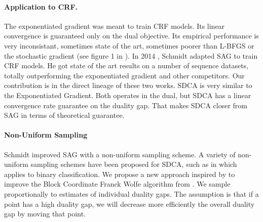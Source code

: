 \documentclass{article}
\DeclareMathOperator{\1}{\mathbb{1}}
\begin{document}
\paragraph{Application to CRF.}
The exponentiated gradient was meant to train CRF models.
Its linear convergence is guaranteed only on the dual objective.
Its empirical performance is very inconsistant, sometimes state of the art, sometimes poorer than L-BFGS or the stochastic gradient (see figure 1 in \cite{schmidt_non-uniform_2015}). 
In 2014 \cite{schmidt_non-uniform_2015}, Schmidt adapted SAG to train CRF models.
He got state of the art results on a number of sequence datasets, totally outperforming the exponentiated gradient and other competitors.
Our contribution is in the direct lineage of these two works.
SDCA is very similar to the Exponentiated Gradient.
Both operates in the dual, but SDCA has a linear convergence rate guarantee on the duality gap.
That makes SDCA closer from SAG in terms of theoretical guarantee.

\paragraph{Non-Uniform Sampling}
Schmidt improved SAG with a non-uniform sampling scheme.
A variety of non-uniform sampling schemes have been proposed for SDCA, such as in \cite{csiba_stochastic_2015} which applies to binary classification.
We propose a new approach inspired by \cite{osokin_minding_2016} to improve the Block Coordinate Franck Wolfe algorithm from \cite{lacoste-julien_block-coordinate_2012}.
We sample proportionally to estimates of individual duality gaps.
The assumption is that if a point has a high duality gap, we will decrease more efficiently  the overall duality gap by moving that point. 
\end{document}
